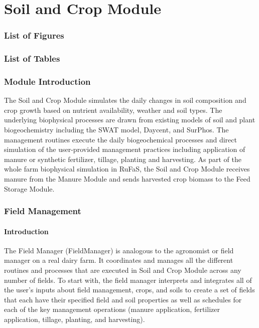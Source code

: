 \part{Soil and Crop Module}
\thispagestyle{fancy}

\localtableofcontents
\newpage

\section*{List of Figures}
\locallistoffigures
\newpage

\section*{List of Tables}
\locallistoftables
\newpage

\section{Module Introduction}
\par\noindent\justifying

The Soil and Crop Module simulates the daily changes in soil composition and crop growth based on nutrient availability, weather and soil types. The underlying biophysical processes are drawn from existing models of soil and plant biogeochemistry including the SWAT model, Daycent, and SurPhos. The management routines execute the daily biogeochemical processes and direct simulation of the user-provided management practices including application of manure or synthetic fertilizer, tillage, planting and harvesting. As part of the whole farm biophysical simulation in RuFaS, the Soil and Crop Module receives manure from the Manure Module and sends harvested crop biomass to the Feed Storage Module.
\vspace{0.2cm}


\section{Field Management}
\subsection{Introduction}
The Field Manager (FieldManager) is analogous to the agronomist or field manager on a real dairy farm. It coordinates and manages all the different routines and processes that are executed in Soil and Crop Module across any number of fields. To start with, the field manager interprets and integrates all of the user’s inputs about field management, crops, and soils to create a set of fields that each have their specified field and soil properties as well as schedules for each of the key management operations (manure application, fertilizer application, tillage, planting, and harvesting). 
\vspace{0.2cm}

